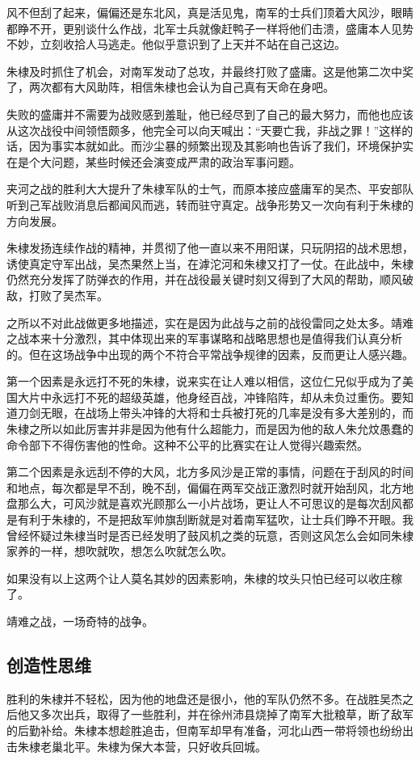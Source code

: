 \begin{multicols}{\theparacolNo}
		风不但刮了起来，偏偏还是东北风，真是活见鬼，南军的士兵们顶着大风沙，眼睛都睁不开，更别谈什么作战，北军士兵就像赶鸭子一样将他们击溃，盛庸本人见势不妙，立刻收拾人马逃走。他似乎意识到了上天并不站在自己这边。

		朱棣及时抓住了机会，对南军发动了总攻，并最终打败了盛庸。这是他第二次中奖了，两次都有大风助阵，相信朱棣也会认为自己真有天命在身吧。

		失败的盛庸并不需要为战败感到羞耻，他已经尽到了自己的最大努力，而他也应该从这次战役中间领悟颇多，他完全可以向天喊出：“天要亡我，非战之罪！”这样的话，因为事实本就如此。而沙尘暴的频繁出现及其影响也告诉了我们，环境保护实在是个大问题，某些时候还会演变成严肃的政治军事问题。

		夹河之战的胜利大大提升了朱棣军队的士气，而原本接应盛庸军的吴杰、平安部队听到己军战败消息后都闻风而逃，转而驻守真定。战争形势又一次向有利于朱棣的方向发展。

		朱棣发扬连续作战的精神，并贯彻了他一直以来不用阳谋，只玩阴招的战术思想，诱使真定守军出战，吴杰果然上当，在滹沱河和朱棣又打了一仗。在此战中，朱棣仍然充分发挥了防弹衣的作用，并在战役最关键时刻又得到了大风的帮助，顺风破敌，打败了吴杰军。

		之所以不对此战做更多地描述，实在是因为此战与之前的战役雷同之处太多。靖难之战本来十分激烈，其中体现出来的军事谋略和战略思想也是值得我们认真分析的。但在这场战争中出现的两个不符合平常战争规律的因素，反而更让人感兴趣。

		第一个因素是永远打不死的朱棣，说来实在让人难以相信，这位仁兄似乎成为了美国大片中永远打不死的超级英雄，他身经百战，冲锋陷阵，却从未负过重伤。要知道刀剑无眼，在战场上带头冲锋的大将和士兵被打死的几率是没有多大差别的，而朱棣之所以如此厉害并非是因为他有什么超能力，而是因为他的敌人朱允炆愚蠢的命令部下不得伤害他的性命。这种不公平的比赛实在让人觉得兴趣索然。

		第二个因素是永远刮不停的大风，北方多风沙是正常的事情，问题在于刮风的时间和地点，每次都是早不刮，晚不刮，偏偏在两军交战正激烈时就开始刮风，北方地盘那么大，可风沙就是喜欢光顾那么一小片战场，更让人不可思议的是每次刮风都是有利于朱棣的，不是把敌军帅旗刮断就是对着南军猛吹，让士兵们睁不开眼。我曾经怀疑过朱棣当时是否已经发明了鼓风机之类的玩意，否则这风怎么会如同朱棣家养的一样，想吹就吹，想怎么吹就怎么吹。

		如果没有以上这两个让人莫名其妙的因素影响，朱棣的坟头只怕已经可以收庄稼了。

		靖难之战，一场奇特的战争。

		\subsection{创造性思维}
		胜利的朱棣并不轻松，因为他的地盘还是很小，他的军队仍然不多。在战胜吴杰之后他又多次出兵，取得了一些胜利，并在徐州沛县烧掉了南军大批粮草，断了敌军的后勤补给。朱棣本想趁胜追击，但南军却早有准备，河北山西一带将领也纷纷出击朱棣老巢北平。朱棣为保大本营，只好收兵回城。


\end{multicols}
